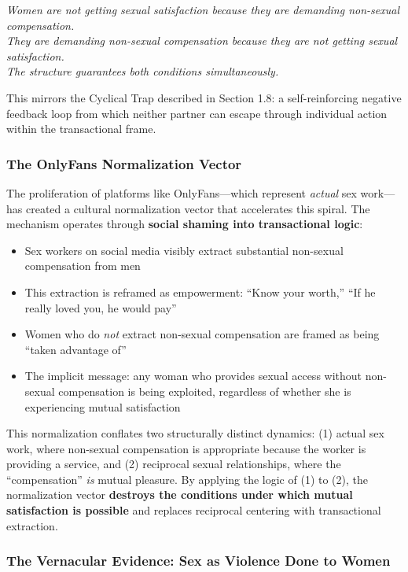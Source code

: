 \documentclass[12pt, letterpaper]{article}
\begin{document}
\begin{center}
\textit{Women are not getting sexual satisfaction because they are demanding non-sexual compensation.\\
They are demanding non-sexual compensation because they are not getting sexual satisfaction.\\
The structure guarantees both conditions simultaneously.}
\end{center}

This mirrors the Cyclical Trap described in Section 1.8: a self-reinforcing negative feedback loop from which neither partner can escape through individual action within the transactional frame.

\subsubsection{The OnlyFans Normalization Vector}

The proliferation of platforms like OnlyFans---which represent \textit{actual} sex work---has created a cultural normalization vector that accelerates this spiral. The mechanism operates through \textbf{social shaming into transactional logic}:

\begin{itemize}
    \item Sex workers on social media visibly extract substantial non-sexual compensation from men
    \item This extraction is reframed as empowerment: ``Know your worth,'' ``If he really loved you, he would pay''
    \item Women who do \textit{not} extract non-sexual compensation are framed as being ``taken advantage of''
    \item The implicit message: any woman who provides sexual access without non-sexual compensation is being exploited, regardless of whether she is experiencing mutual satisfaction
\end{itemize}

This normalization conflates two structurally distinct dynamics: (1) actual sex work, where non-sexual compensation is appropriate because the worker is providing a service, and (2) reciprocal sexual relationships, where the ``compensation'' \textit{is} mutual pleasure. By applying the logic of (1) to (2), the normalization vector \textbf{destroys the conditions under which mutual satisfaction is possible} and replaces reciprocal centering with transactional extraction.

\subsubsection{The Vernacular Evidence: Sex as Violence Done to Women}
\end{document}

